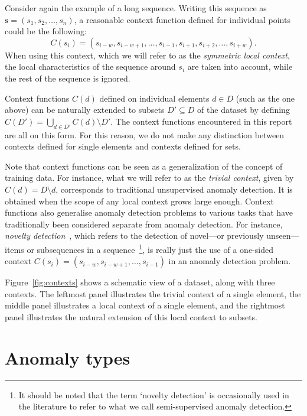 Consider again the example of a long sequence. Writing this sequence as $\mathbf{s} = (s_1, s_2, \dots, s_n)$, a reasonable context function defined for individual points could be the following:
\[
    C(s_i) = (s_{i-w}, s_{i - w + 1}, \dots, s_{i - 1}, s_{i + 1}, s_{i + 2}, \dots, s_{i + w}).
\]
When using this context, which we will refer to as the \emph{symmetric local context}, the local characteristics of the sequence around $s_i$ are taken into account, while the rest of the sequence is ignored.

Context functions $C(d)$ defined on individual elements $d \in D$ (such as the one above) can be naturally extended to subsets $D' \subseteq D$ of the dataset by defining $C(D') = \bigcup_{d \in D'} C(d) \setminus D'$. The context functions encountered in this report are all on this form. For this reason, we do not make any distinction between contexts defined for single elements and contexts defined for sets.

Note that context functions can be seen as a generalization of the concept of training data. For instance, what we will refer to as the \emph{trivial context}, given by $C(d) = D \setminus d$, corresponds to traditional unsupervised anomaly detection. It is obtained when the scope of any local context grows large enough. Context functions also generalise anomaly detection problems to various tasks that have traditionally been considered separate from anomaly detection. For instance, \emph{novelty detection}~\cite{chandola}, which refers to the detection of novel---or previously unseen---items or subsequences in a sequence~\footnote{It should be noted that the term `novelty detection' is occasionally used in the literature to refer to what we call semi-supervised anomaly detection.}, is really just the use of a one-sided context $C(s_i) = (s_{i-w}, s_{i - w + 1}, \dots, s_{i - 1})$ in an anomaly detection problem.

Figure~\ref{fig:contexts} shows a schematic view of a dataset, along with three contexts. The leftmost panel illustrates the trivial context of a single element, the middle panel illustrates a local context of a single element, and the rightmost panel illustrates the natural extension of this local context to subsets.

\section{Anomaly types}
\label{sect:anomaly_types}

